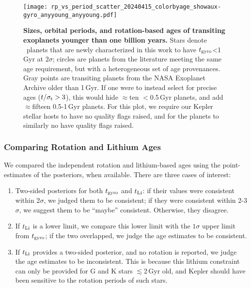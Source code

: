 \documentclass[11pt,twocolumn,tighten]{aastex63}
\begin{document}
\begin{figure}[!t]
  \begin{center}
    \texttt{[image: rp\_vs\_period\_scatter\_20240415\_colorbyage\_showaux-gyro\_anyyoung\_anyyoung.pdf]}
  \end{center}
  \vspace{-0.5cm}
  \caption{
    {\bf Sizes, orbital periods, and rotation-based ages of transiting
    exoplanets younger than one billion years.} Stars denote
    \nplyounggyrotwosigmanograzingnoruwe\ planets that are newly
    characterized in this work to have $t_{\rm gyro}$<1\,Gyr at
    $2$$\sigma$; circles are planets from the literature meeting the
    same age requirement, but with a heterogeneous set of age
    provenances.  Gray points are transiting planets from the NASA
    Exoplanet Archive older than 1\,Gyr.  If one were to instead select for
    precise ages ($t/\sigma_{\rm t}>3$), this would hide $\approx$ten
    $<$0.5\,Gyr planets, and add $\approx$fifteen 0.5-1\,Gyr planets.
    For this plot, we require our Kepler stellar hosts to have no
    quality flags raised, and for the planets to
    similarly no have quality flags raised. 
    \label{fig:rp_period_age_results}
  }
\end{figure}

\subsubsection{Comparing Rotation and Lithium Ages}

We compared the independent rotation and lithium-based ages using the
point-estimates of the posteriors, when available.  There are three
cases of interest:

\begin{enumerate}[leftmargin=*,topsep=0pt,itemsep=-1ex,partopsep=1ex,parsep=1ex]
  \item Two-sided posteriors for both $t_{\rm gyro}$ and $t_{\rm Li}$:
    if their values were consistent within 2$\sigma$, we judged them
    to be consistent; if they were consistent within 2-3$\sigma$, we
    suggest them to be ``maybe'' consistent.  Otherwise, they
    disagree.
  \item If $t_{\rm Li}$ is a lower limit, we compare this lower limit
    with the $1\sigma$ upper limit from $t_{\rm gyro}$; if the two
    overlapped, we judge the age estimates to be consistent.
  \item If $t_{\rm Li}$ provides a two-sided posterior, and no
    rotation is reported, we judge the age estimates to be
    inconsistent.  This is because this lithium constraint can only be
    provided for G and K stars $\lesssim$2\,Gyr old, and Kepler should
    have been sensitive to the rotation periods of such stars.
\end{enumerate}
\end{document}
